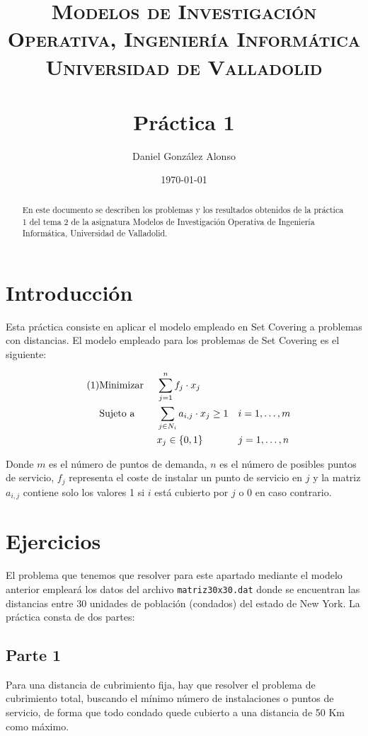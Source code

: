\documentclass[a4paper,11pt]{article}
\title{
	\vspace{-25pt}
	\normalfont \Large \textsc{
		Modelos de Investigación Operativa,
        Ingeniería Informática\\
        Universidad de Valladolid
	}\\[10pt]
	\horrule{1pt}\\[10pt]
	\huge \textbf{
		Práctica 1
	}\\
	\horrule{1pt}
}
\author{
	\normalfont \Large Daniel González Alonso
}
\date{
	\normalfont \large \today
}
\newcommand\numberthis{				%
	\addtocounter{equation}{1}\tag{\theequation}
}
\begin{document}
\maketitle

\begin{abstract}
En este documento se describen los problemas y los resultados obtenidos de la práctica 1 del tema 2 de la asignatura Modelos de Investigación Operativa de Ingeniería Informática, Universidad de Valladolid.
\end{abstract}

\section{Introducción}

Esta práctica consiste en aplicar el modelo empleado en Set Covering a problemas con distancias. El modelo empleado para los problemas de Set Covering es el siguiente:

\begin{align*}\numberthis
   	&\textrm{Minimizar }	&& \sum_{j=1}^{n}{f_j \cdot x_j} \\
   	&\textrm{Sujeto a }		&& \sum_{j \in N_{i}}{a_{i,j} \cdot x_{j} \geq 1} 	&& i=1,\ldots,m \\
	&						&& x_{j} \in \{0,1\}					&& j=1,\ldots,n
\end{align*}

Donde ${m}$ es el número de puntos de demanda, ${n}$ es el número de posibles puntos de servicio, ${f_j}$ representa el coste de instalar un punto de servicio en ${j}$ y la matriz ${a_{i,j}}$ contiene solo los valores 1 si ${i}$ está cubierto por ${j}$ o 0 en caso contrario.\\

\section{Ejercicios}

El problema que tenemos que resolver para este apartado mediante el modelo anterior empleará los datos del archivo \texttt{matriz30x30.dat} donde se encuentran las distancias entre 30 unidades de población (condados) del estado de New York. La práctica consta de dos partes:

\newpage
\subsection{Parte 1}
Para una distancia de cubrimiento fija, hay que resolver el problema de cubrimiento total, buscando el mínimo número de instalaciones o puntos de servicio, de forma que todo condado quede cubierto a una distancia de 50 Km como máximo.
\end{document}

